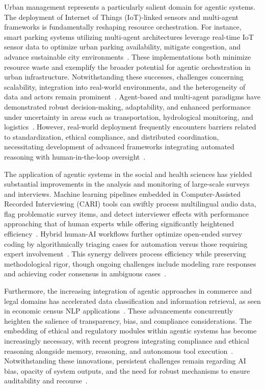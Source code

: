 \documentclass[11pt]{article}
\begin{document}
Urban management represents a particularly salient domain for agentic systems. The deployment of Internet of Things (IoT)-linked sensors and multi-agent frameworks is fundamentally reshaping resource orchestration. For instance, smart parking systems utilizing multi-agent architectures leverage real-time IoT sensor data to optimize urban parking availability, mitigate congestion, and advance sustainable city environments~\cite{ref20}. These implementations both minimize resource waste and exemplify the broader potential for agentic orchestration in urban infrastructure. Notwithstanding these successes, challenges concerning scalability, integration into real-world environments, and the heterogeneity of data and actors remain prominent~\cite{ref20,ref40,ref111,ref113,ref114}. Agent-based and multi-agent paradigms have demonstrated robust decision-making, adaptability, and enhanced performance under uncertainty in areas such as transportation, hydrological monitoring, and logistics~\cite{ref40,ref45,ref91,ref92,ref93,ref111,ref113,ref114}. However, real-world deployment frequently encounters barriers related to standardization, ethical compliance, and distributed coordination, necessitating development of advanced frameworks integrating automated reasoning with human-in-the-loop oversight~\cite{ref30,ref40,ref45,ref58,ref91,ref92,ref93,ref94,ref95,ref96,ref113,ref114,ref115}.

The application of agentic systems in the social and health sciences has yielded substantial improvements in the analysis and monitoring of large-scale surveys and interviews. Machine learning pipelines embedded in Computer-Assisted Recorded Interviewing (CARI) tools can swiftly process multilingual audio data, flag problematic survey items, and detect interviewer effects with performance approaching that of human experts while offering significantly heightened efficiency~\cite{ref27,ref28,ref29,ref97,ref98,ref99,ref100,ref112}. Hybrid human-AI workflows further optimize open-ended survey coding by algorithmically triaging cases for automation versus those requiring expert involvement~\cite{ref27,ref28}. This synergy delivers process efficiency while preserving methodological rigor, though ongoing challenges include modeling rare responses and achieving coder consensus in ambiguous cases~\cite{ref27,ref29,ref97}.

Furthermore, the increasing integration of agentic approaches in commerce and legal domains has accelerated data classification and information retrieval, as seen in economic census NLP applications~\cite{ref26}. These advancements concurrently heighten the salience of transparency, bias, and compliance considerations. The embedding of ethical and regulatory modules within agentic systems has become increasingly necessary, with recent progress integrating compliance and ethical reasoning alongside memory, reasoning, and autonomous tool execution~\cite{ref40,ref109,ref111}. Notwithstanding these innovations, persistent challenges remain regarding AI bias, opacity of system outputs, and the need for robust mechanisms to ensure auditability and recourse~\cite{ref109,ref110,ref112,ref113,ref114,ref115}.
\end{document}
